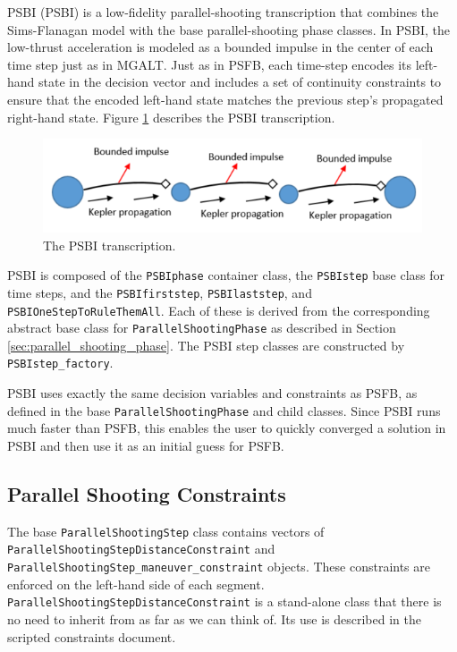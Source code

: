\acl{PSBI} (\acs{PSBI}) is a low-fidelity parallel-shooting transcription that combines the Sims-Flanagan model \cite{SimsFlanagan1999} with the base parallel-shooting phase classes. In \ac{PSBI}, the low-thrust acceleration is modeled as a bounded impulse in the center of each time step just as in \ac{MGALT}. Just as in \ac{PSFB}, each time-step encodes its left-hand state in the decision vector and includes a set of continuity constraints to ensure that the encoded left-hand state matches the previous step's propagated right-hand state. Figure \ref{fig:PSBI_diagram} describes the \ac{PSBI} transcription.

\begin{figure}[hb]
	\centering
	\includegraphics[width=0.8\linewidth]{./mission/PSBI.png}
	\caption{ The \ac{PSBI} transcription.}
	\label{fig:PSBI_diagram}
\end{figure}

\ac{PSBI} is composed of the \texttt{PSBIphase} container class, the \texttt{PSBIstep} base class for time steps, and the \texttt{PSBIfirststep}, \texttt{PSBIlaststep}, and \texttt{PSBIOneStepToRuleThemAll}. Each of these is derived from the corresponding abstract base class for \texttt{ParallelShootingPhase} as described in Section \ref{sec:parallel_shooting_phase}. The \ac{PSBI} step classes are constructed by \texttt{PSBIstep\_factory}.

\ac{PSBI} uses exactly the same decision variables and constraints as \ac{PSFB}, as defined in the base \texttt{ParallelShootingPhase} and child classes. Since \ac{PSBI} runs much faster than \ac{PSFB}, this enables the user to quickly converged a solution in \ac{PSBI} and then use it as an initial guess for \ac{PSFB}.

\subsection{Parallel Shooting Constraints}
\label{subsec:parallel_shooting_constraints}

The base \texttt{ParallelShootingStep} class contains vectors of \texttt{ParallelShootingStepDistanceConstraint} and \texttt{ParallelShootingStep\_maneuver\_constraint} objects. These constraints are enforced on the left-hand side of each segment. \texttt{ParallelShootingStepDistanceConstraint} is a stand-alone class that there is no need to inherit from as far as we can think of. Its use is described in the scripted constraints document.

